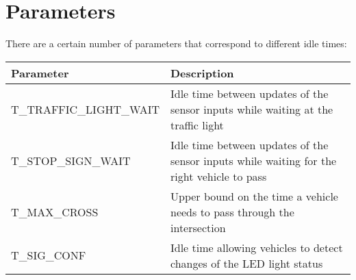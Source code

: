 \documentclass[11pt]{article}
\theoremstyle{definition}
\begin{document}
\section{Parameters}
%
There are a certain number of parameters that correspond to different idle times:
%
\begin{center}
  \begin{tabular}{ l p{} }
	Parameter & Description\\
    \hline
    T\_TRAFFIC\_LIGHT\_WAIT & Idle time between updates of the sensor inputs while waiting at the traffic light\\
		T\_STOP\_SIGN\_WAIT & Idle time between updates of the sensor inputs while waiting for the right vehicle to pass\\
		T\_MAX\_CROSS & Upper bound on the time a vehicle needs to pass through the intersection\\
		T\_SIG\_CONF & Idle time allowing vehicles to detect changes of the LED light status\\
		\hline
  \end{tabular}
\end{center}
\end{document}

